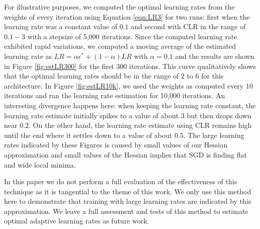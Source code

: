 \documentclass{article}
\begin{document}
For illustrative purposes, we computed the optimal learning rates from the weights of every iteration using Equation \ref{eqn:LR3} for two runs: first when the learning rate was a constant value of  $0.1$ and second with CLR in the range of $0.1 - 3$ with a stepsize of 5,000 iterations.
Since the computed learning rate exhibited rapid variations, we computed a moving average of the estimated learning rate as $ LR = \alpha \epsilon^* + (1 - \alpha ) LR $ with $\alpha = 0.1 $  and the results are shown in Figure \ref{fig:estLR300}  for the first 300 iterations.
This curve qualitatively shows that the optimal learning rates should be in the range of 2 to 6 for this architecture.
In Figure \ref{fig:estLR10k}, we used the weights as computed every 10 iterations and ran the learning rate estimation for 10,000 iterations.  
An interesting divergence happens here: when keeping the learning rate constant, the learning rate estimate initially spikes to a value of about 3 but then drops down near $0.2$.
On the other hand, the learning rate estimate using CLR remains high until the end where it settles down to a value of about $0.5$.
The large learning rates indicated by these Figures is caused by small values of our Hessian approximation and small values of the Hessian implies that SGD is finding flat and wide local minima.

In this paper we do not perform a full evaluation of the effectiveness of this technique as it is tangential to the theme of this work. 
We only use this method here to demonstrate that training with large learning rates are indicated by this approximation.
We leave a full assessment and tests of this method to estimate optimal adaptive learning rates as future work.


\end{document}
